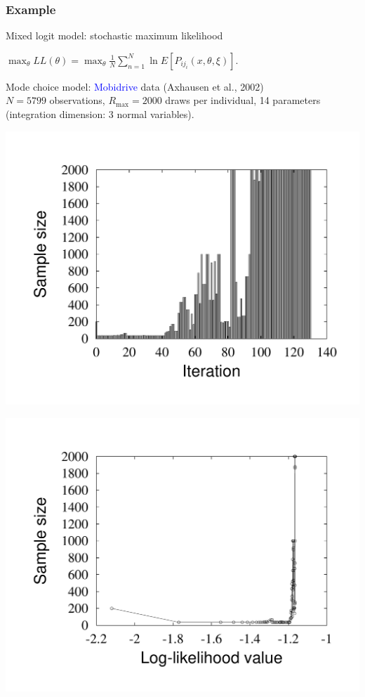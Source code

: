 \documentclass{beamer}
\begin{document}
\begin{frame}[fragile]
\frametitle{Example}

Mixed logit model: stochastic maximum likelihood
\begin{tcolorbox}
	\begin{center}
		$\max_{\theta} LL(\theta) =
		\max_{\theta} \frac{1}{N} \sum_{n = 1}^{N} \ln E[P_{ij_i}(x,\theta,\xi)].$
	\end{center}
\end{tcolorbox}

Mode choice model: \textcolor{blue}{Mobidrive} data (Axhausen et al., 2002)\\
$N = 5799$ observations, $R_{\max} = 2000$ draws per individual, 14 parameters (integration dimension: 3 normal variables).

\begin{center}
\begin{minipage}{0.49\linewidth}
\includegraphics[width=\linewidth]{2000_sample_iter.pdf}
\end{minipage}
\begin{minipage}{0.49\linewidth}
\includegraphics[width=\linewidth]{2000_sample_fct.pdf}

\end{minipage}
\end{center}
\end{frame}
\end{document}
